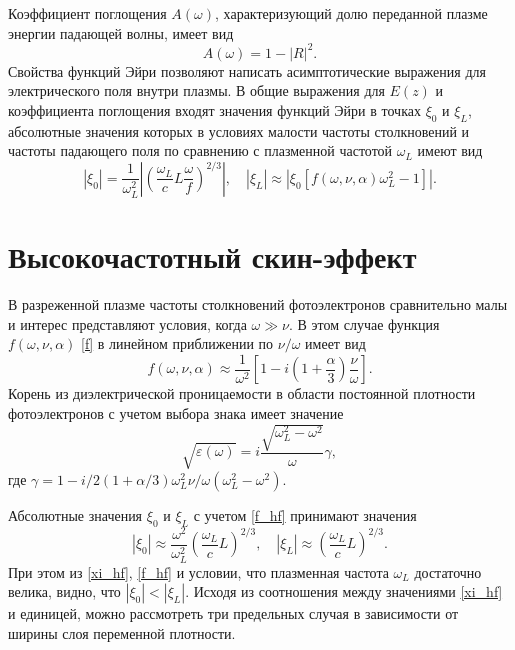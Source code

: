 \documentclass[12pt,a4paper]{article}
\numberwithin{equation}{section}
\begin{document}
Коэффициент поглощения $A\left(\omega\right)$, характеризующий долю переданной плазме энергии падающей волны, имеет вид
\begin{equation}
    \label{absorp_common}
    A\left(\omega\right) = 1-\left|R\right|^2.
\end{equation}
Свойства функций Эйри позволяют написать асимптотические выражения для электрического поля внутри плазмы. В общие выражения для $E\left(z\right)$ и коэффициента поглощения входят значения функций Эйри в точках $\xi_0$ и $\xi_L$, абсолютные значения которых в условиях малости частоты столкновений и частоты падающего поля по сравнению с плазменной частотой $\omega_L$ имеют вид 
\begin{equation}
\label{xi}
    |\xi_0|= \frac{1}{\omega_L^2}\left|\left(\frac{\omega_L}{c}L\frac{\omega}{f}\right)^{2/3}\right|,\quad |\xi_L|\approx \left|\xi_0 \left[f\left(\omega, \nu, \alpha\right)\omega_L^2-1\right]\right| .
\end{equation}
\section{Высокочастотный скин-эффект}
В разреженной плазме частоты столкновений фотоэлектронов сравнительно малы и интерес представляют условия, когда $\omega \gg \nu$. В этом случае функция $f\left(\omega, \nu, \alpha\right)$ \eqref{f} в линейном приближении по $\nu/\omega$ имеет вид
\begin{equation}
    \label{f_hf}
    f\left(\omega, \nu, \alpha\right) \approx \frac{1}{\omega^2}\left[1-i\left(1+\frac{\alpha}{3}\right)\frac{\nu}{\omega}\right].
\end{equation}
Корень из диэлектрической проницаемости в области постоянной плотности фотоэлектронов с учетом выбора знака имеет значение
\begin{equation}
    \label{perm_nu}
    \sqrt{\varepsilon\left(\omega\right)} = i\frac{\sqrt{\omega_L^2-\omega^2}}{\omega}\gamma,
\end{equation}
где $\gamma = 1-i/2\left(1+\alpha/3\right)\omega_L^2\nu/\omega\left(\omega_L^2-\omega^2\right)$.

Абсолютные значения $\xi_0$ и $\xi_L$ с учетом \eqref{f_hf} принимают значения
\begin{equation}
\label{xi_hf}
    |\xi_0|\approx \frac{\omega^2}{\omega_L^2}\left(\frac{\omega_L}{c}L\right)^{2/3},\quad |\xi_L|\approx \left(\frac{\omega_L}{c}L\right)^{2/3}.
\end{equation}
При этом из \eqref{xi_hf}, \eqref{f_hf} и условии, что плазменная частота $\omega_L$ достаточно велика, видно, что $|\xi_0|<|\xi_L|$. Исходя из соотношения между значениями \eqref{xi_hf} и единицей, можно рассмотреть три предельных случая в зависимости от ширины слоя переменной плотности.
\end{document}
